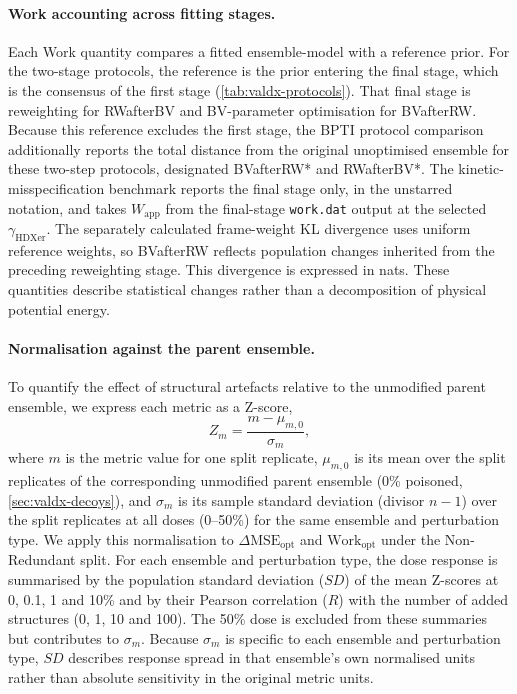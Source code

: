 \paragraph{Work accounting across fitting stages.}
Each Work quantity compares a fitted ensemble-model with a reference prior. For the two-stage protocols, the reference is the prior entering the final stage, which is the consensus of the first stage (\cref{tab:valdx-protocols}). That final stage is reweighting for RWafterBV and BV-parameter optimisation for BVafterRW. Because this reference excludes the first stage, the BPTI protocol comparison additionally reports the total distance from the original unoptimised ensemble for these two-step protocols, designated BVafterRW* and RWafterBV*. The kinetic-misspecification benchmark reports the final stage only, in the unstarred notation, and takes $W_\text{app}$ from the final-stage \texttt{work.dat} output at the selected $\gamma_\text{HDXer}$. The separately calculated frame-weight KL divergence uses uniform reference weights, so BVafterRW reflects population changes inherited from the preceding reweighting stage. This divergence is expressed in nats. These quantities describe statistical changes rather than a decomposition of physical potential energy.

\paragraph{Normalisation against the parent ensemble.}
To quantify the effect of structural artefacts relative to the unmodified parent ensemble, we express each metric as a Z-score,
\begin{equation}
    Z_m=\frac{m-\mu_{m,0}}{\sigma_m},
    \label{eq:valdx-z-score}
\end{equation}
where $m$ is the metric value for one split replicate, $\mu_{m,0}$ is its mean over the split replicates of the corresponding unmodified parent ensemble (0\% poisoned, \cref{sec:valdx-decoys}), and $\sigma_m$ is its sample standard deviation (divisor $n-1$) over the split replicates at all doses (0--50\%) for the same ensemble and perturbation type. We apply this normalisation to $\Delta\text{MSE}_\text{opt}$ and $\text{Work}_\text{opt}$ under the Non-Redundant split. For each ensemble and perturbation type, the dose response is summarised by the population standard deviation ($SD$) of the mean Z-scores at 0, 0.1, 1 and 10\% and by their Pearson correlation ($R$) with the number of added structures (0, 1, 10 and 100). The 50\% dose is excluded from these summaries but contributes to $\sigma_m$. Because $\sigma_m$ is specific to each ensemble and perturbation type, $SD$ describes response spread in that ensemble's own normalised units rather than absolute sensitivity in the original metric units.

